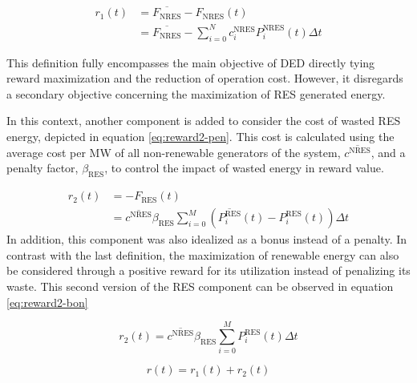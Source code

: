 \begin{description}
	
	\begin{equation} \label{eq:reward1}
		\begin{split}
			r_1(t) &= \overline{F_\text{NRES}} - F_\text{NRES}(t) \\
			&= \overline{F_\text{NRES}} - \sum^N_{i=0} c^\text{NRES}_i P^\text{NRES}_i(t) \Delta t
		\end{split}
	\end{equation}
	
	This definition fully encompasses the main objective of \ac{DED} directly tying reward maximization and the reduction of operation cost. However, it disregards a secondary objective concerning the maximization of \ac{RES} generated energy. \par
	In this context, another component is added to consider the cost of wasted \ac{RES} energy, depicted in equation \ref{eq:reward2-pen}. This cost is calculated using the average cost per MW of all non-renewable generators of the system, $\overline{c^\text{NRES}}$, and a penalty factor, $\beta_\text{RES}$, to control the impact of wasted energy in reward value. \par
	
	\begin{equation} \label{eq:reward2-pen}
		\begin{split}
			r_2(t) &= - F_\text{RES}(t) \\
			&= \overline{c^\text{NRES}} \beta_\text{RES} \sum^M_{i=0} (\overline{P^\text{RES}_i}(t) - P^\text{RES}_i(t)) \Delta t 
		\end{split}
	\end{equation}
	In addition, this component was also idealized as a bonus instead of a penalty. In contrast with the last definition, the maximization of renewable energy can also be considered through a positive reward for its utilization instead of penalizing its waste. This second version of the \ac{RES} component can be observed in equation \ref{eq:reward2-bon}\par
	
	\begin{equation} \label{eq:reward2-bon}
			r_2(t) = \overline{c^\text{NRES}} \beta_\text{RES} \sum^M_{i=0} P^\text{RES}_i(t) \Delta t 
	\end{equation}
	
	
	\begin{equation}
		r(t) = r_1(t) + r_2(t)
	\end{equation}
\end{description}


